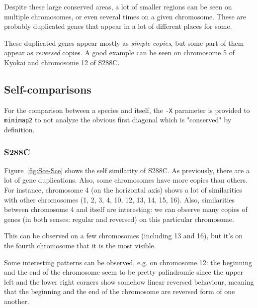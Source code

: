 \documentclass{article}
\begin{document}
Despite these large conserved areas, a lot of smaller regions can be seen on multiple chromosomes, or even several
times on a given chromosome. These are probably duplicated genes that appear in a lot of different places for some.

These duplicated genes appear mostly as \textit{simple copies}, but some part of them appear as \textit{reversed}
copies. A good example can be seen on chromosome 5 of Kyokai and chromosome 12 of S288C.

\subsection{Self-comparisons}

For the comparison between a species and itself, the \texttt{-X} parameter is provided to \texttt{minimap2} to not
analyze the obvious first diagonal which is "conserved" by definition.

\subsubsection{S288C}

Figure~\ref{fig:Sce-Sce} shows the self similarity of S288C. As previously, there are a lot of gene duplications.
Also, some chromosomes have more copies than others. For instance, chromosome 4 (on the horizontal axis) shows a
lot of similarities with other chromosomes (1, 2, 3, 4, 10, 12, 13, 14, 15, 16). Also, similarities between chromosome
4 and itself are interesting: we can observe many copies of genes (in both senses: regular and reversed) on this
particular chromosome.

This can be observed on a few chromosomes (including 13 and 16), but it's on the fourth chromosome that it is the
most visible.

Some interesting patterns can be observed, e.g. on chromosome 12: the beginning and the end of the chromosome
seem to be pretty palindromic since the upper left and the lower right corners show somehow linear reversed behaviour,
meaning that the beginning and the end of the chromosome are reversed form of one another.
\end{document}
